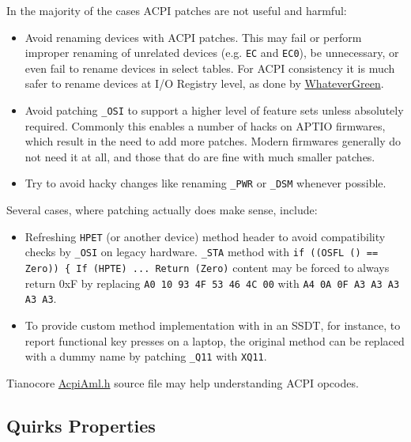 \documentclass[]{article}
\begin{document}
In the majority of the cases ACPI patches are not useful and harmful:

\begin{itemize}
\item
  Avoid renaming devices with ACPI patches. This may fail or perform
  improper renaming of unrelated devices (e.g. \texttt{EC} and
  \texttt{EC0}), be unnecessary, or even fail to rename devices in select tables. For
  ACPI consistency it is much safer to rename devices at I/O Registry
  level, as done by
  \href{https://github.com/acidanthera/WhateverGreen}{WhateverGreen}.
\item
  Avoid patching \texttt{\_OSI} to support a higher level of feature sets
  unless absolutely required. Commonly this enables a number of hacks on APTIO
  firmwares, which result in the need to add more patches. Modern firmwares
  generally do not need it at all, and those that do are fine with much
  smaller patches.
\item
  Try to avoid hacky changes like renaming \texttt{\_PWR} or \texttt{\_DSM}
  whenever possible.
\end{itemize}

Several cases, where patching actually does make sense, include:

\begin{itemize}
\item
  Refreshing \texttt{HPET} (or another device) method header to avoid
  compatibility checks by \texttt{\_OSI} on legacy hardware. \texttt{\_STA}
  method with \texttt{if ((OSFL () == Zero)) \{ If (HPTE)  ...  Return (Zero)}
  content may be forced to always return 0xF by replacing
  \texttt{A0 10 93 4F 53 46 4C 00} with \texttt{A4 0A 0F A3 A3 A3 A3 A3}.
\item
  To provide custom method implementation with in an SSDT, for instance,
  to report functional key presses on a laptop, the original method can be replaced
  with a dummy name by patching \texttt{\_Q11} with \texttt{XQ11}.
\end{itemize}

Tianocore \href{https://github.com/tianocore/edk2/blob/UDK2018/MdePkg/Include/IndustryStandard/AcpiAml.h}{AcpiAml.h}
source file may help understanding ACPI opcodes.

\subsection{Quirks Properties}\label{acpipropsquirks}
\end{document}
